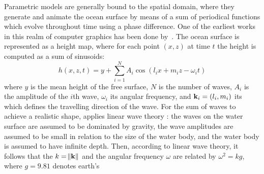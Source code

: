 %
%
Parametric models are generally bound to the spatial domain, where they
generate and animate the ocean surface by means of a sum of periodical functions
which evolve throughout time using a phase difference. One of the earliest works
in this realm of computer graphics has been done by~\citet{Max:1981}. The ocean
surface is represented as a height map, where for each point $(x,z)$ at time $t$
the height is computed as a sum of sinusoids:
\begin{equation}
h(x,z,t) = y + \sum_{i=1}^N A_i \cos (l_i x + m_i z - \omega_i t)
\end{equation}
where $y$ is the mean height of the free surface, $N$ is the number of waves,
$A_i$ is the amplitude of the $i$th wave, $\omega_i$ its angular frequency,
and $\mathbf{k}_i = (l_i, m_i)$ its \wavevector which defines the
travelling direction of the wave. For the sum of waves to achieve a
realistic shape, \citeauthor{Max:1981} applies linear wave theory \citep{book:airy1845tides}:
the waves on the water surface are assumed to be dominated by gravity, the wave
amplitudes are assumed to be small in relation to the size of the water body,
and the water body is assumed to have infinite depth. Then, according to linear
wave theory, it follows that the \wavenumber $k=\norm{\mathbf{k}}$ and the angular
frequency $\omega$ are related by $\omega^2=kg$, where $g=9.81$ denotes earth's
